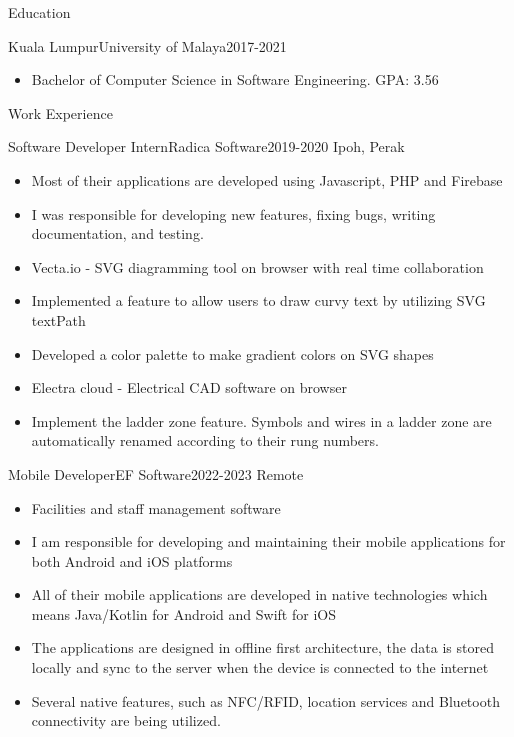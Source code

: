 \documentclass[]{mcdowellcv}
\begin{document}
\makeheader


\begin{cvsection}{Education}
	\begin{cvsubsection}{Kuala Lumpur}{University of Malaya}{2017-2021}
		\begin{itemize}
			\item Bachelor of Computer Science in Software Engineering. GPA: 3.56
		\end{itemize}
	\end{cvsubsection}
\end{cvsection}
\begin{cvsection}{Work Experience}
	\begin{cvsubsection}{Software Developer Intern}{Radica Software}{2019-2020}
		Ipoh, Perak
		\begin{itemize}%
			\item Most of their applications are developed using Javascript, PHP and Firebase
			\item I was responsible for developing new features, fixing bugs, writing documentation, and testing.
			\item Vecta.io - SVG diagramming tool on browser with real time collaboration
			\item Implemented a feature to allow users to draw curvy text by utilizing SVG textPath
			\item Developed a color palette to make gradient colors on SVG shapes
			\item Electra cloud - Electrical CAD software on browser
			\item Implement the ladder zone feature. Symbols and wires in a ladder zone are automatically renamed according to their rung numbers.
		\end{itemize}
	\end{cvsubsection}
	\begin{cvsubsection}{Mobile Developer}{EF Software}{2022-2023}
		Remote
		\begin{itemize}%
			\item Facilities and staff management software
			\item I am responsible for developing and maintaining their mobile applications for both Android and iOS platforms
			\item All of their mobile applications are developed in native technologies which means Java/Kotlin for Android and Swift for iOS
			\item The applications are designed in offline first architecture, the data is stored locally and sync to the server when the device is connected to the internet
			\item Several native features, such as NFC/RFID, location services and Bluetooth connectivity are being utilized.
		\end{itemize}
	\end{cvsubsection}
\end{cvsection}
\end{document}
